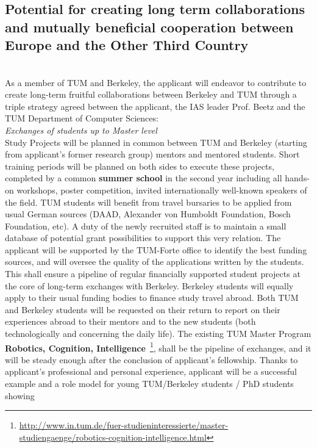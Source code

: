 \subsection{Potential for creating long term collaborations and mutually beneficial cooperation between 
Europe and the Other Third Country} 
\\
As a member of TUM and Berkeley, the applicant  will endeavor to contribute to create long-term
fruitful  collaborations  between  Berkeley and TUM through  a triple strategy 
agreed between the applicant, the IAS  leader Prof.  Beetz and the  TUM Department  
of  Computer Sciences:\\
\emph{Exchanges  of students  up  to  Master level}\\  
Study  Projects will  be planned in common between TUM and  Berkeley
(starting  from  applicant's  former   research  group)  mentors  and  mentored
students.  Short training  periods will  be planned  on both  sides to
execute these  projects, completed  by a common  \textbf{summer school}  in the
second  year  including all  hands-on  workshops, poster  competition,
invited  internationally  well-known   speakers  of  the  field.   TUM
students will benefit  from travel bursaries to be  applied from usual
German  sources  (DAAD,   Alexander  von  Humboldt  Foundation,  Bosch
Foundation, etc). A duty of  the newly recruited staff is to maintain
a small database of potential grant possibilities to support this very
relation. The applicant will be supported  by the TUM-Forte office to identify the
best  funding  sources,  and    will  oversee  the  quality  of  the
applications written by the students.  This shall ensure a pipeline of
regular  financially  supported  student   projects  at  the  core  of
long-term  exchanges  with   Berkeley. Berkeley  students will equally  apply to
their usual funding bodies to finance study travel abroad.  Both TUM and
Berkeley students  will be  requested on
their return  to report on  their experiences abroad to  their mentors
and to the new students (both technologically and concerning the daily
life).   The  existing  TUM  Master  Program  \textbf{Robotics,  Cognition,
Intelligence}~\footnote{\url{http://www.in.tum.de/fuer-studieninteressierte/master-studiengaenge/robotics-cognition-intelligence.html}}, 
shall  be the  pipeline of exchanges,  and it  will be
steady  enough after  the conclusion  of applicant's  fellowship.  Thanks  to applicant's
professional and  personal experience, applicant will be  a successful example
and  a role  model for  young TUM/Berkeley  students /  PhD  students showing
